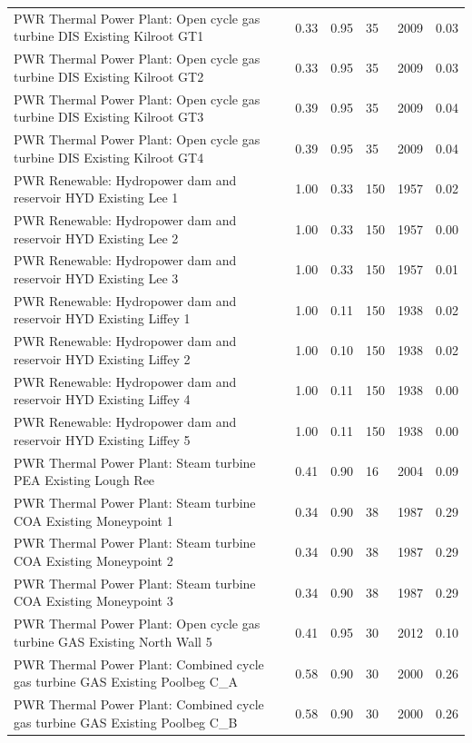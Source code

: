 \documentclass[journal abbreviation, manuscript]{copernicus}
\begin{document}
\begin{center}
\begin{longtable}{p{15em}lllll}
PWR Thermal Power Plant: Open cycle gas turbine DIS Existing Kilroot GT1 & 0.33 & 0.95 & 35 & 2009 & 0.03 \\
PWR Thermal Power Plant: Open cycle gas turbine DIS Existing Kilroot GT2 & 0.33 & 0.95 & 35 & 2009 & 0.03 \\
PWR Thermal Power Plant: Open cycle gas turbine DIS Existing Kilroot GT3 & 0.39 & 0.95 & 35 & 2009 & 0.04 \\
PWR Thermal Power Plant: Open cycle gas turbine DIS Existing Kilroot GT4 & 0.39 & 0.95 & 35 & 2009 & 0.04 \\
PWR Renewable: Hydropower dam and reservoir HYD Existing Lee 1 & 1.00 & 0.33 & 150 & 1957 & 0.02 \\
PWR Renewable: Hydropower dam and reservoir HYD Existing Lee 2 & 1.00 & 0.33 & 150 & 1957 & 0.00 \\
PWR Renewable: Hydropower dam and reservoir HYD Existing Lee 3 & 1.00 & 0.33 & 150 & 1957 & 0.01 \\
PWR Renewable: Hydropower dam and reservoir HYD Existing Liffey 1 & 1.00 & 0.11 & 150 & 1938 & 0.02 \\
PWR Renewable: Hydropower dam and reservoir HYD Existing Liffey 2 & 1.00 & 0.10 & 150 & 1938 & 0.02 \\
PWR Renewable: Hydropower dam and reservoir HYD Existing Liffey 4 & 1.00 & 0.11 & 150 & 1938 & 0.00 \\
PWR Renewable: Hydropower dam and reservoir HYD Existing Liffey 5 & 1.00 & 0.11 & 150 & 1938 & 0.00 \\
PWR Thermal Power Plant: Steam turbine PEA Existing Lough Ree & 0.41 & 0.90 & 16 & 2004 & 0.09 \\
PWR Thermal Power Plant: Steam turbine COA Existing Moneypoint 1 & 0.34 & 0.90 & 38 & 1987 & 0.29 \\
PWR Thermal Power Plant: Steam turbine COA Existing Moneypoint 2 & 0.34 & 0.90 & 38 & 1987 & 0.29 \\
PWR Thermal Power Plant: Steam turbine COA Existing Moneypoint 3 & 0.34 & 0.90 & 38 & 1987 & 0.29 \\
PWR Thermal Power Plant: Open cycle gas turbine GAS Existing North Wall 5 & 0.41 & 0.95 & 30 & 2012 & 0.10 \\
PWR Thermal Power Plant: Combined cycle gas turbine GAS Existing Poolbeg C\_A & 0.58 & 0.90 & 30 & 2000 & 0.26 \\
PWR Thermal Power Plant: Combined cycle gas turbine GAS Existing Poolbeg C\_B & 0.58 & 0.90 & 30 & 2000 & 0.26 \\

\end{longtable}
\end{center}
\end{document}
